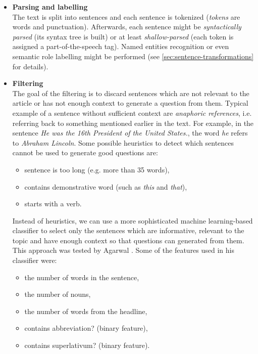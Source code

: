 \documentclass[12pt, twoside]{fithesis2}
\renewcommand{\_}{\leavevmode \kern0.07em\vbox{\hrule width0.4em}}
\newcommand{\squarebullet}{\textcolor{black}{\raisebox{0.15em}{\rule{4pt}{4pt}}}}
\newcommand{\emptysquarebullet}{\textcolor{black}{\raisebox{0.10em}{\tiny$\square$}}}
\newenvironment{myItemize}{
  \begin{itemize}[leftmargin=2em,rightmargin=1em,itemsep=\parskip ,parsep=0em,topsep=0em,partopsep=0em]
  \renewcommand{\labelitemi}{\squarebullet}
  \renewcommand{\labelitemii}{\textbullet}
}{
  \end{itemize}
}
\begin{document}
\begin{myItemize}
  \item \textbf{Parsing and labelling}\\
    The text is split into sentences and each sentence is tokenized (\emph{tokens} are words and punctuation).
    Afterwards, each sentence might be \emph{syntactically parsed} (its syntax tree is built)
    or at least \textit{shallow-parsed} (each token is assigned a part-of-the-speech tag).
    Named entities recognition or even semantic role labelling might be performed
    (see \autoref{sec:sentence-transformations} for details).

  \item \textbf{Filtering}\\
    The goal of the filtering is to discard sentences which are not relevant to the article or has not enough context to generate a question from them.
    Typical example of a sentence without sufficient context are \emph{anaphoric references},
    i.e. referring back to something mentioned earlier in the text.
    For example, in the sentence \emph{He was the 16th President of the United States.},
    the word \emph{he} refers to \emph{Abraham Lincoln}.
  Some possible heuristics to detect which sentences cannot be used to generate good questions \cite{questions-wolfe} are:
  \begin{itemize}
  \item sentence is too long (e.g. more than 35 words),
  \item contains demonstrative word (such as \emph{this} and \emph{that}),
  \item starts with a verb.
  \end{itemize}

  Instead of heuristics, we can use a more sophisticated machine learning-based classifier to select only the sentences which are informative, relevant to the topic and have enough context so that questions can generated from them. This approach was tested by Agarwal \cite{question-gen-textbooks}.
Some of the features used in his classifier were:
  \begin{itemize}
  \item the number of words in the sentence,
  \item the number of nouns,
  \item the number of words from the headline,
  \item contains abbreviation? (binary feature),
  \item contains superlativum? (binary feature).
  \end{itemize}


\end{myItemize}
\end{document}
